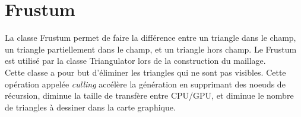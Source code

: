   \section{Frustum}
  La classe Frustum permet de faire la différence entre un triangle dans le champ, un triangle partiellement dans le champ, et un triangle hors champ. Le Frustum est utilisé par la classe Triangulator lors de la construction du maillage.\\
  
  Cette classe a pour but d'éliminer les triangles qui ne sont pas visibles. Cette opération appelée \textit{culling} accélère la génération en supprimant des noeuds de récursion, diminue la taille de transfère entre CPU/GPU, et diminue le nombre de triangles à dessiner dans la carte graphique.
  
  
 \newpage %
 